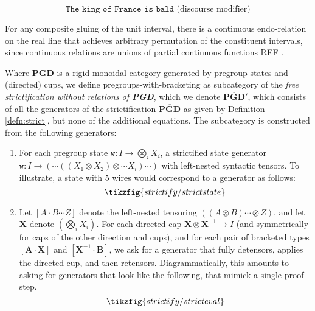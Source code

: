 \begin{example}
\[\texttt{The king of France is bald} \text{ (discourse modifier)}\]
\end{example}





\begin{construction}
For any composite gluing of the unit interval, there is a continuous endo-relation on the real line that achieves arbitrary permutation of the constituent intervals, since continuous relations are unions of partial continuous functions \bR REF \e.
\end{construction}




\begin{construction}\label{cons:bracketing}
Where $\mathbf{PGD}$ is a rigid monoidal category generated by pregroup states and (directed) cups, we define pregroups-with-bracketing as subcategory of the \emph{free strictification without relations of \textbf{PGD}}, which we denote $\overline{\mathbf{PGD}}'$, which consists of all the generators of the strictification $\overline{\mathbf{PGD}}$ as given by Definition \ref{defn:strict}, but none of the additional equations. The subcategory is constructed from the following generators:
\begin{enumerate}
\item For each pregroup state $\texttt{w}: I \rightarrow \bigotimes\limits_{i} X_i$, a strictified state generator $\texttt{w}: I \rightarrow (\cdots((X_1 \otimes X_2) \otimes \cdots X_i) \cdots )$ with left-nested syntactic tensors. To illustrate, a state with 5 wires would correspond to a generator as follows:
\[\tikzfig{strictify/strictstate}\]
\item Let $[A \cdot B \cdots Z]$ denote the left-nested tensoring $((A \otimes B) \cdots \otimes Z)$, and let $\mathbf{X}$ denote $(\bigotimes\limits_i X_i)$. For each directed cap $\mathbf{X} \otimes \mathbf{X}^{-1} \rightarrow I$ (and symmetrically for caps of the other direction and cups), and for each pair of bracketed types $[\mathbf{A} \cdot \mathbf{X}]$ and $[\mathbf{X}^{-1} \cdot \mathbf{B}]$, we ask for a generator that fully detensors, applies the directed cup, and then retensors. Diagrammatically, this amounts to asking for generators that look like the following, that mimick a single proof step.
\[\tikzfig{strictify/stricteval}\]
\end{enumerate}
\end{construction}


